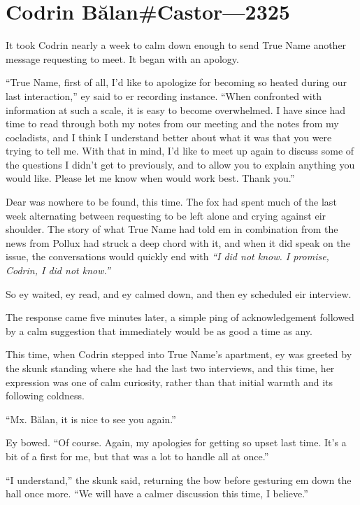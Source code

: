 \hypertarget{codrin-bux103lancastor-2325}{%
\chapter{Codrin Bălan\#Castor—2325}\label{codrin-bux103lancastor-2325}}

It took Codrin nearly a week to calm down enough to send True Name another message requesting to meet. It began with an apology.

``True Name, first of all, I'd like to apologize for becoming so heated during our last interaction,'' ey said to er recording instance. ``When confronted with information at such a scale, it is easy to become overwhelmed. I have since had time to read through both my notes from our meeting and the notes from my cocladists, and I think I understand better about what it was that you were trying to tell me. With that in mind, I'd like to meet up again to discuss some of the questions I didn't get to previously, and to allow you to explain anything you would like. Please let me know when would work best. Thank you.''

Dear was nowhere to be found, this time. The fox had spent much of the last week alternating between requesting to be left alone and crying against eir shoulder. The story of what True Name had told em in combination from the news from Pollux had struck a deep chord with it, and when it did speak on the issue, the conversations would quickly end with \emph{``I did not know. I promise, Codrin, I did not know.''}

So ey waited, ey read, and ey calmed down, and then ey scheduled eir interview.

The response came five minutes later, a simple ping of acknowledgement followed by a calm suggestion that immediately would be as good a time as any.

This time, when Codrin stepped into True Name's apartment, ey was greeted by the skunk standing where she had the last two interviews, and this time, her expression was one of calm curiosity, rather than that initial warmth and its following coldness.

``Mx. Bălan, it is nice to see you again.''

Ey bowed. ``Of course. Again, my apologies for getting so upset last time. It's a bit of a first for me, but that was a lot to handle all at once.''

``I understand,'' the skunk said, returning the bow before gesturing em down the hall once more. ``We will have a calmer discussion this time, I believe.''

